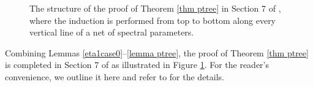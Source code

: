 \documentclass{article}
\newcommand{\1}{\mathds{1}}
\numberwithin{equation}{section}
\theoremstyle{plain} %
\theoremstyle{remark}
\begin{document}
\begin{figure}[htb]
\begin{center}
\end{center}
\caption{The structure of the proof of Theorem \ref{thm ptree} in Section 7 of \cite{PartII_high}, where the induction is performed from top to bottom along every vertical line of a net of spectral parameters. }\label{Fig pfchart2}
\end{figure}

Combining Lemmas \ref{eta1case0}--\ref{lemma ptree}, the proof of Theorem \ref{thm ptree} is completed in Section 7 of \cite{PartII_high} as illustrated in Figure \ref{Fig pfchart2}. For the reader's convenience, we outline it here and refer to \cite{PartII_high} for the details.
\end{document}
